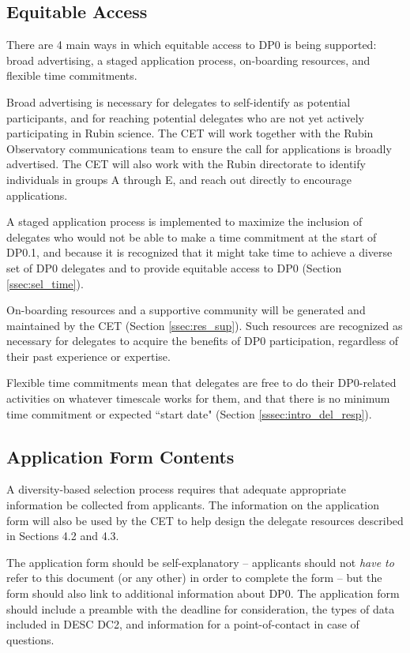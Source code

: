 \documentclass[DM,lsstdraft,authoryear,toc]{lsstdoc}
\begin{document}
\subsection{Equitable Access}\label{ssec:sel_equity}

There are 4 main ways in which equitable access to DP0 is being supported: broad advertising, a staged application process, on-boarding resources, and flexible time commitments.

Broad advertising is necessary for delegates to self-identify as potential participants, and for reaching potential delegates who are not yet actively participating in Rubin science.
The CET will work together with the Rubin Observatory communications team to ensure the call for applications is broadly advertised. 
The CET will also work with the Rubin directorate to identify individuals in groups A through E, and reach out directly to encourage applications. 

A staged application process is implemented to maximize the inclusion of delegates who would not be able to make a time commitment at the start of DP0.1, and because it is recognized that it might take time to achieve a diverse set of DP0 delegates and to provide equitable access to DP0 (Section \ref{ssec:sel_time}).

On-boarding resources and a supportive community will be generated and maintained by the CET (Section \ref{ssec:res_sup}).
Such resources are recognized as necessary for delegates to acquire the benefits of DP0 participation, regardless of their past experience or expertise.

Flexible time commitments mean that delegates are free to do their DP0-related activities on whatever timescale works for them, and that there is no minimum time commitment or expected ``start date" (Section \ref{sssec:intro_del_resp}).


\subsection{Application Form Contents}\label{ssec:sel_form}

A diversity-based selection process requires that adequate appropriate information be collected from applicants.
The information on the application form will also be used by the CET to help design the delegate resources described in Sections 4.2 and 4.3. 

The application form should be self-explanatory -- applicants should not \emph{have to} refer to this document (or any other) in order to complete the form -- but the form should also link to additional information about DP0.
The application form should include a preamble with the deadline for consideration, the types of data included in DESC DC2, and information for a point-of-contact in case of questions.
\end{document}

